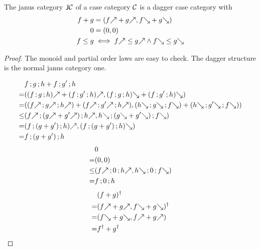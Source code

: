 \documentclass[runningheads,envcountsame]{llncs}
\begin{document}
\begin{lemma}
    The janus category $\mathsf{J}\mathcal{C}$ of a case category $\mathcal{C}$ is a dagger case category with
    \begin{align}
        f + g &= (\f{f} + \f{g}, \b{f} + \b{g}) \\
        0 &= (0, 0) \\
        f \leq g &\iff \f{f} \leq \f{g} \wedge \b{f} \leq \b{g}    
    \end{align}
\end{lemma}
\begin{proof}
    The monoid and partial order laws are easy to check. The dagger structure is the normal janus category one.
    
    \begin{align}
      & \comp{f}{\comp{g}{h}} + \comp{f}{\comp{g'}{h}} \\
    = & (\f{(\comp{f}{\comp{g}{h}})} + \f{(\comp{f}{\comp{g'}{h}})}, \b{(\comp{f}{\comp{g}{h}})} + \b{(\comp{f}{\comp{g'}{h}})}) \\
    = & ((\comp{\f{f}}{\comp{\f{g}}{\f{h}}}) + (\comp{\f{f}}{\comp{\f{g'}}{\f{h}}}), (\comp{\b{h}}{\comp{\b{g}}{\b{f}}}) + (\comp{\b{h}}{\comp{\b{g'}}{\b{f}}})) \\
    \leq & (\comp{\f{f}}{\comp{(\f{g} + \f{g'})}{\f{h}}}, \comp{\b{h}}{\comp{(\b{g} + \b{g'})}{\b{f}}}) \\
    = & (\f{\comp{f}{\comp{(g + g')}{h}})}, \b{(\comp{f}{\comp{(g + g')}{h}})}) \\
    = & \comp{f}{\comp{(g + g')}{h}}
    \end{align}
    \begin{align}
      & 0\\
    = & (0, 0) \\
    \leq & (\comp{\f{f}}{\comp{0}{\f{h}}}, \comp{\comp{\b{h}}{0}}{\b{f}})  \\
    = & \comp{f}{\comp{0}{h}}
    \end{align}
    \begin{align}
      & \rev{(f + g)} \\
    = & \rev{(\f{f} + \f{g}, \b{f} + \b{g})} \\
    = & (\b{f} + \b{g}, \f{f} + \f{g}) \\
    = & \rev{f} + \rev{g}
    \end{align}
\end{proof}
\end{document}
